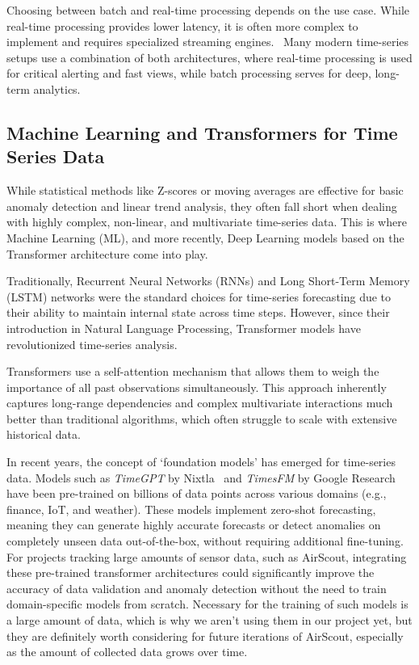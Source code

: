 Choosing between batch and real-time processing depends on the use case. While
real-time processing provides lower latency, it is often more complex to
implement and requires specialized streaming engines.~\cite{BatchVsRealTime:01}
Many modern time-series setups use a combination of both architectures, where
real-time processing is used for critical alerting and fast views, while batch
processing serves for deep, long-term analytics.
\subsection{Machine Learning and Transformers for Time Series Data}

While statistical methods like Z-scores or moving averages are effective for
basic anomaly detection and linear trend analysis, they often fall short when
dealing with highly complex, non-linear, and multivariate time-series data.
This is where Machine Learning (ML), and more recently, Deep Learning models
based on the Transformer architecture come into play.\\\cite{AI&ML:23}

Traditionally, Recurrent Neural Networks (RNNs) and Long Short-Term Memory
(LSTM) networks were the standard choices for time-series forecasting due to
their ability to maintain internal state across time steps. However, since
their introduction in Natural Language Processing, Transformer models have
revolutionized time-series analysis.

Transformers use a self-attention mechanism that allows them to weigh the
importance of all past observations simultaneously. This approach inherently
captures long-range dependencies and complex multivariate interactions much
better than traditional algorithms, which often struggle to scale with
extensive historical data.

In recent years, the concept of `foundation models' has emerged for time-series
data. Models such as \textit{TimeGPT} by Nixtla~\cite{TimeGPT:01} and
\textit{TimesFM} by Google Research~\cite{TimesFM:01} have been pre-trained on
billions of data points across various domains (e.g., finance, IoT, and
weather). These models implement zero-shot forecasting, meaning they can
generate highly accurate forecasts or detect anomalies on completely unseen
data out-of-the-box, without requiring additional fine-tuning. For projects
tracking large amounts of sensor data, such as AirScout, integrating these
pre-trained transformer architectures could significantly improve the accuracy of
data validation and anomaly detection without the need to train domain-specific
models from scratch. Necessary for the training of such models is a large
amount of data, which is why we aren't using them in our project yet, but they
are definitely worth considering for future iterations of AirScout, especially
as the amount of collected data grows over time.

